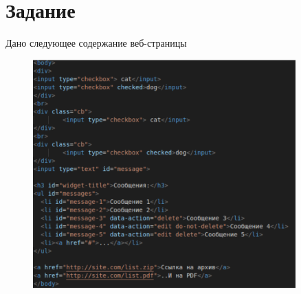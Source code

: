 \documentclass[a4paper,12pt]{extarticle}
\begin{document}
\section{Задание}
Дано следующее содержание веб-страницы
\begin{figure}[!ht]
    \centering
    \includegraphics[width=0.9\textwidth]{lab2_task3.png}
\end{figure}
\end{document}
